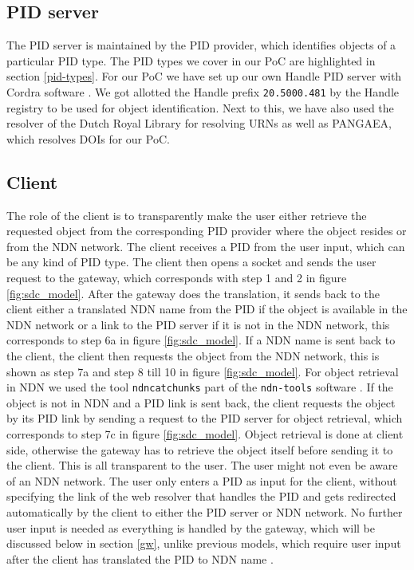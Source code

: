 \subsection{PID server}
The PID server is maintained by the PID provider, which identifies objects of a particular PID type. The PID types we cover in our PoC are highlighted in section \ref{pid-types}. For our PoC we have set up our own Handle PID server with Cordra software \cite{cor}. We got allotted the Handle prefix \texttt{20.5000.481} by the Handle registry to be used for object identification. Next to this, we have also used the resolver of the Dutch Royal Library for resolving URNs as well as PANGAEA, which resolves DOIs for our PoC.

\subsection{Client}
The role of the client is to transparently make the user either retrieve the requested object from the corresponding PID provider where the object resides or from the NDN network. 
The client receives a PID from the user input, which can be any kind of PID type. The client then opens a socket and sends the user request to the gateway, which corresponds with step 1 and 2 in figure \ref{fig:sdc_model}. After the gateway does the translation, it sends back to the client either a translated NDN name from the PID if the object is available in the NDN network or a link to the PID server if it is not in the NDN network, this corresponds to step 6a in figure \ref{fig:sdc_model}. If a NDN name is sent back to the client, the client then requests the object from the NDN network, this is shown as step 7a and step 8 till 10 in figure \ref{fig:sdc_model}. For object retrieval in NDN we used the tool \texttt{ndncatchunks} part of the \texttt{ndn-tools} software \cite{ndn-tools}. If the object is not in NDN and a PID link is sent back, the client requests the object by its PID link by sending a request to the PID server for object retrieval, which corresponds to step 7c in figure \ref{fig:sdc_model}. Object retrieval is done at client side, otherwise the gateway has to retrieve the object itself before sending it to the client.
This is all transparent to the user. The user might not even be aware of an NDN network. The user only enters a PID as input for the client, without specifying the link of the web resolver that handles the PID and gets redirected automatically by the client to either the PID server or NDN network. No further user input is needed as everything is handled by the gateway, which will be discussed below in section \ref{gw}, %
unlike previous models, which require user input after the client has translated the PID to NDN name \cite{ndn-app-aware}. 


